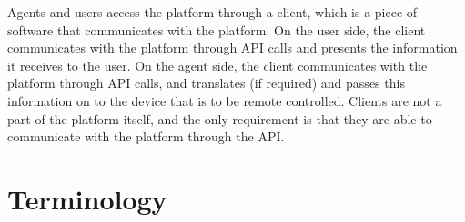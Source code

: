 Agents and users access the platform through a client, which is a piece of software that communicates with the platform.
On the user side, the client communicates with the platform through API calls and presents the information it receives to the user.
On the agent side, the client communicates with the platform through API calls, and translates (if required) and passes this information on to the device that is to be remote controlled.
Clients are not a part of the platform itself, and the only requirement is that they are able to communicate with the platform through the API.

\section{Terminology}

